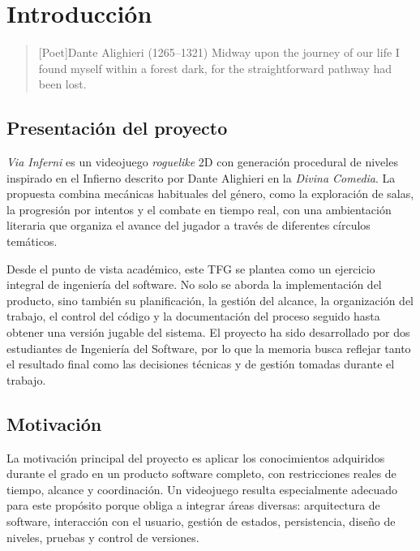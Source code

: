 \chapter{Introducción}

\begin{quotation}[Poet]{Dante Alighieri (1265--1321)}
Midway upon the journey of our life I found myself within a forest dark, for the straightforward pathway had been lost.
\end{quotation}

\begin{abstract}
Este capítulo presenta una visión general de \textit{Via Inferni} y sitúa el proyecto
dentro del marco de un Trabajo de Fin de Grado de Ingeniería del Software. Se resume la
propuesta del videojuego, la motivación que justifica su desarrollo y la organización
general de la memoria.
\end{abstract}

\section{Presentación del proyecto}
\textit{Via Inferni} es un videojuego \textit{roguelike} 2D con generación procedural
de niveles inspirado en el Infierno descrito por Dante Alighieri en la
\textit{Divina Comedia}. La propuesta combina mecánicas habituales del género, como la
exploración de salas, la progresión por intentos y el combate en tiempo real, con una
ambientación literaria que organiza el avance del jugador a través de diferentes círculos
temáticos.

Desde el punto de vista académico, este TFG se plantea como un ejercicio integral de
ingeniería del software. No solo se aborda la implementación del producto, sino también
su planificación, la gestión del alcance, la organización del trabajo, el control del
código y la documentación del proceso seguido hasta obtener una versión jugable del
sistema. El proyecto ha sido desarrollado por dos estudiantes de Ingeniería del Software,
por lo que la memoria busca reflejar tanto el resultado final como las decisiones
técnicas y de gestión tomadas durante el trabajo.

\section{Motivación}
La motivación principal del proyecto es aplicar los conocimientos adquiridos durante el
grado en un producto software completo, con restricciones reales de tiempo, alcance y
coordinación. Un videojuego resulta especialmente adecuado para este propósito porque
obliga a integrar áreas diversas: arquitectura de software, interacción con el usuario,
gestión de estados, persistencia, diseño de niveles, pruebas y control de versiones.

